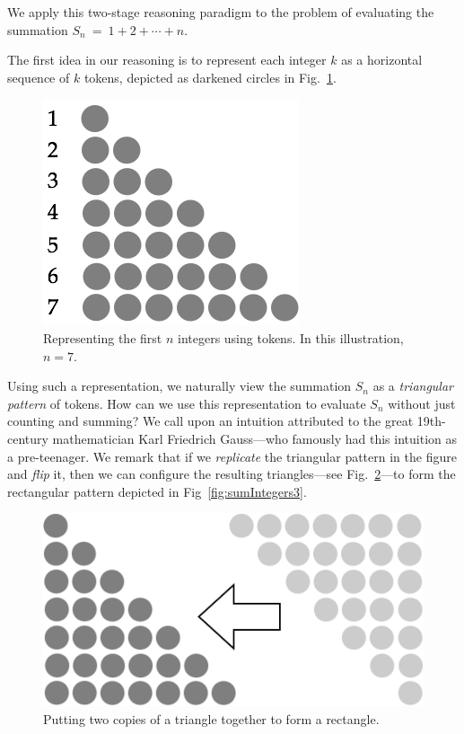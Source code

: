 We apply this two-stage reasoning paradigm to the problem of evaluating the summation $S_n \ = \ 1 + 2 + \cdots + n$.

The first idea in our reasoning is to represent each integer $k$ as a horizontal sequence of $k$ tokens, depicted as darkened circles in Fig.~\ref{fig:sumIntegers1}.
\begin{figure}[ht]
\begin{center}
       \includegraphics[scale=0.35]{FiguresMaths/SumIntegersBasis}
\caption{Representing the first $n$ integers using tokens.  In
  this illustration, $n=7$.}
       \label{fig:sumIntegers1}
\end{center}
\end{figure}
Using such a representation, we naturally view the summation $S_n$ as a \textit{triangular pattern} of tokens.  How can we use this representation to evaluate $S_n$ without just counting and summing?  We call upon an intuition attributed to the great 19th-century mathematician Karl Friedrich Gauss---who famously had this intuition as a pre-teenager.  We remark that if we {\em replicate} the triangular pattern in the figure and {\em flip} it, then we can configure the resulting triangles---see Fig.~\ref{fig:sumIntegers2}---to form the rectangular pattern depicted in Fig~\ref{fig:sumIntegers3}.
\begin{figure}[ht]
\begin{center}
       \includegraphics[scale=0.35]{FiguresMaths/SumIntegersIntermediate}
   \caption{Putting two copies of a triangle together to form a rectangle.}
       \label{fig:sumIntegers2}
\end{center}
\end{figure}
